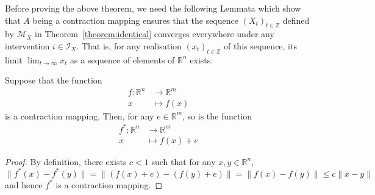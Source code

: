 Before proving the above theorem, we need the following Lemmata which show that $A$ being a contraction mapping ensures that the sequence $(X_t)_{t\in\mathbb{Z}}$ defined by $\mathcal{M}_X$ in Theorem~\ref{theorem:identical} converges everywhere under any intervention $i\in\mathcal{I}_X$.
That is, for any realisation $(x_t)_{t\in\mathbb{Z}}$ of this sequence, its limit $\lim_{t\rightarrow \infty}x_t$ as a sequence of elements of $\mathbb{R}^n$ exists.

\medskip

\begin{lemma}\label{lemma:contraction_add}
Suppose that the function
\begin{align*}
f: \mathbb{R}^n & \rightarrow \mathbb{R}^m \\
 x & \mapsto f(x)
\end{align*}
is a contraction mapping.
Then, for any $e \in \mathbb{R}^m$, so is the function
\begin{align*}
f^*: \mathbb{R}^n & \rightarrow \mathbb{R}^m \\
 x & \mapsto f(x) + e
\end{align*}
\end{lemma}

\medskip

\begin{proof}
By definition, there exists $c<1$ such that for any $x,y\in \mathbb{R}^n$,
\[
\| f^*(x)-f^*(y) \| = \| (f(x)+e)-(f(y)+e) \| = \| f(x)-f(y) \| \leq c \| x - y \|
\]
and hence $f^*$ is a contraction mapping.
\end{proof}

\medskip

